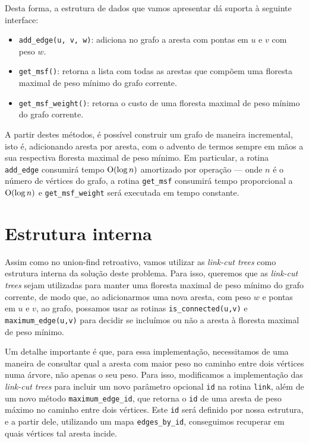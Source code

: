 Desta forma, a estrutura de dados que vamos apresentar dá suporta à seguinte interface:

\begin{itemize}
    \item \texttt{add\_edge(u, v, w)}: adiciona no grafo a aresta com pontas em $u$ e $v$ com peso $w$.
    \item \texttt{get\_msf()}: retorna a lista com todas as arestas que compõem uma floresta maximal de peso mínimo do grafo corrente.
    \item \texttt{get\_msf\_weight()}: retorna o custo de uma floresta maximal de peso mínimo do grafo corrente.
\end{itemize}

A partir destes métodos, é possível construir um grafo de maneira incremental, isto é, adicionando aresta por aresta, com o advento de termos sempre em mãos a sua respectiva floresta maximal de peso mínimo. Em particular, a rotina \texttt{add\_edge} consumirá tempo $\mathrm{O} (\log n)$ amortizado por operação --- onde $n$ é o número de vértices do grafo, a rotina \texttt{get\_msf} consumirá tempo proporcional a $\mathrm{O} (\log n)$ e \texttt{get\_msf\_weight} será executada em tempo constante.

\section{Estrutura interna}
\label{sec:imsf-est-int}

Assim como no union-find retroativo, vamos utilizar as \emph{link-cut trees} como estrutura interna da solução deste problema. Para isso, queremos que as \emph{link-cut trees} sejam utilizadas para manter uma floresta maximal de peso mínimo do grafo corrente, de modo que, ao adicionarmos uma nova aresta, com peso $w$ e pontas em $u$ e $v$, ao grafo, possamos usar as rotinas \texttt{is\_connected(u,v)} e \texttt{maximum\_edge(u,v)} para decidir se incluímos ou não a aresta à floresta maximal de peso mínimo.

Um detalhe importante é que, para essa implementação, necessitamos de uma maneira de consultar qual a aresta com maior peso no caminho entre dois vértices numa árvore, não apenas o seu peso. Para isso, modificamos a implementação das \emph{link-cut trees} para incluir um novo parâmetro opcional \texttt{id} na rotina \texttt{link}, além de um novo  método \texttt{maximum\_edge\_id}, que retorna o \texttt{id} de uma aresta de peso máximo no caminho entre dois vértices. Este \texttt{id} será definido por nossa estrutura, e a partir dele, utilizando um mapa \texttt{edges\_by\_id}, conseguimos recuperar em quais vértices tal aresta incide.

